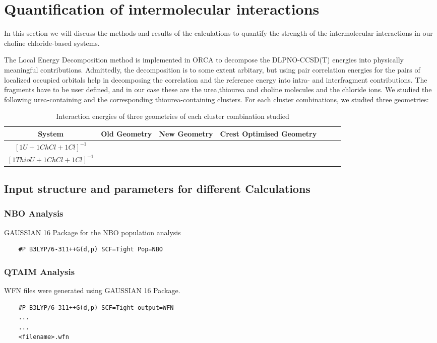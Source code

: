\section{Quantification of intermolecular interactions}
\label{sec:quantification_interactions}
In this section we will discuss the methods and results of the calculations to quantify the strength of the intermolecular interactions in our choline chloride-based systems.



The Local Energy Decomposition method is implemented in ORCA to decompose the DLPNO-CCSD(T) energies into physically meaningful contributions.
Admittedly, the decomposition is to some extent arbitary, but using pair correlation energies for the pairs of localized occupied orbitals help in decomposing the correlation and the reference energy into intra- and interfragment contributions.
The fragments have to be user defined, and in our case these are the urea,thiourea and choline molecules and the chloride ions.
We studied the following urea-containing and the corresponding thiourea-containing clusters.
For each cluster combinations, we studied three geometries:
\begin{table}
\centering
\begin{tabular}{|c|c|c|c|c|c|c|} \hline
System & Old Geometry & New Geometry & Crest Optimised Geometry \\ \hline
$[1U+1ChCl+1Cl]^{-1}$ &  & &  \\ \hline
$[1ThioU+1ChCl+1Cl]^{-1}$ &  & &  \\ \hline
\end{tabular}
\caption{Interaction energies of three geometries of each cluster combination studied}
\end{table}
\subsection{Input structure and parameters for different Calculations}
\subsubsection{NBO Analysis}
GAUSSIAN 16 Package for the NBO population analysis
\begin{verbatim}
    #P B3LYP/6-311++G(d,p) SCF=Tight Pop=NBO
\end{verbatim}
\subsubsection{QTAIM Analysis}
WFN files were generated using GAUSSIAN 16 Package.
\begin{verbatim}
    #P B3LYP/6-311++G(d,p) SCF=Tight output=WFN
    ...
    ...
    <filename>.wfn
\end{verbatim}
